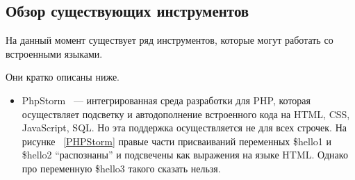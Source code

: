 \subsection{Обзор существующих инструментов}
На данный момент существует ряд инструментов, которые могут работать со встроенными языками. 

Они кратко описаны ниже. 
\begin{itemize}
\item
{
    PhpStorm \cite{PHPStorm} ~--- интегрированная среда разработки для PHP, которая осуществляет подсветку и автодополнение встроенного кода на HTML, CSS, JavaScript, SQL. Но эта поддержка осуществляется не для всех строчек. На рисунке ~\ref{PHPStorm} правые части присваиваний переменных \$hello1 и \$hello2 “распознаны” и подсвечены как выражения на языке HTML. Однако про переменную \$hello3 такого сказать нельзя.

}
\end{itemize}
